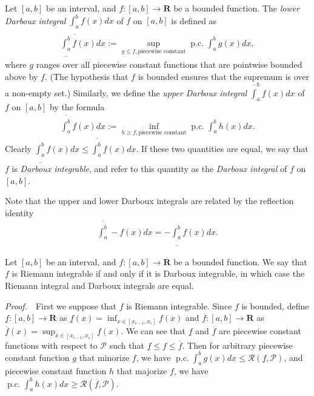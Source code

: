 \documentclass{book}
\theoremstyle{defstyle}
\theoremstyle{thmstyle}
\DeclareMathOperator{\PiecewiseConstant}{p.c.}
\newcommand{\pcint}{\PiecewiseConstant\int}
\newcommand{\pff}{\noindent\emph{Proof.}~~}
\begin{document}
\begin{definition}\label{def:darboux integral}
    Let $[a, b]$ be an interval, and $f : [a, b] \to \mathbf{R}$ be a bounded function. The \emph{lower Darboux integral} $\underline{\int_{a}^{b}} f(x)dx$ of $f$ on $[a, b]$ is defined as
        \begin{align*}
            \underline{\int_{a}^{b}} f(x)dx := \sup_{g \leq f, \text{piecewise constant}}\pcint_{a}^{b}g(x)dx,
        \end{align*}
    where $g$ ranges over all piecewise constant functions that are pointwise bounded above by $f$. (The hypothesis that $f$ is bounded ensures that the supremum is over a non-empty set.) Similarly, we define the \emph{upper Darboux integral} $\overline\int_{a}^{b} f(x)dx$ of $f$ on $[a, b]$ by the formula
        \begin{align*}
            \overline{\int_{a}^{b}} f(x)dx := \inf_{h \geq f, \text{piecewise constant}} \pcint_{a}^{b} h(x)dx.
        \end{align*}
    Clearly $\underline{\int_{a}^{b}} f(x)dx \leq \overline{\int_{a}^{b}} f(x)dx$. If these two quantities are equal, we say that $f$ is \emph{Darboux integrable}, and refer to this quantity as the \emph{Darboux integral} of $f$ on $[a, b]$.
\end{definition}

\begin{remark}
    Note that the upper and lower Darboux integrals are related by the reflection identity
        \begin{align*}
            \overline{\int_{a}^{b}} -f(x)dx = - \underline{\int_{a}^{b}}f(x)dx.
        \end{align*}
\end{remark}


\begin{proposition}\label{thm:riemann and darboux integral are equal under bounded function}
    Let $[a, b]$ be an interval, and $f: [a, b] \to \mathbf{R}$ be a bounded function. We say that $f$ is Riemann integrable if and only if it is Darboux integrable, in which case the Riemann integral and Darboux integrals are equal.
\end{proposition}

\pff First we suppose that $f$ is Riemann integrable. Since $f$ is bounded, define $\underline{f} : [a, b] \to \mathbf{R}$ as $\underline{f}(x) = \inf_{x \in [x_{i - 1}, x_i]}f(x)$ and $\overline{f} : [a, b] \to \mathbf{R}$ as $\overline{f}(x) = \sup_{x \in [x_{i - 1}, x_i]}f(x)$. We can see that $\underline{f}$ and $\overline{f}$ are piecewise constant functions with respect to $\mathcal{P}$ such that $\underline{f} \leq f \leq \overline{f}$. Then for arbitrary piecewise constant function $g$ that minorize $f$, we have $\pcint_{a}^{b}g(x)dx \leq \mathcal{R}(\underline{f}, \mathcal{P})$, and piecewise constant function $h$ that majorize $f$, we have $\pcint_{a}^{b}h(x)dx \geq \mathcal{R}(\overline{f}, \mathcal{P})$.
\end{document}
